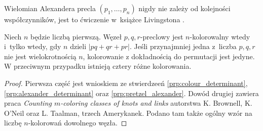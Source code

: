 Wielomian Alexandera precla $(p_1, \ldots, p_n)$ nigdy nie zależy od kolejności współczynników, jest to ćwiczenie w~książce Livingstona \cite[s. 215]{livingston93}.

\begin{proposition}
    Niech $n$ będzie liczbą pierwszą.
    Węzeł $p, q, r$-preclowy jest $n$-kolorowalny wtedy i~tylko wtedy, gdy $n$ dzieli $|pq+qr+pr|$.
    Jeśli przynajmniej jedna z~liczba $p, q, r$ nie jest wielokrotnością $n$, kolorowanie z dokładnością do permutacji jest jedyne.
    W przeciwnym przypadku istnieją cztery różne kolorowania.
%
\end{proposition}

\begin{proof}
    Pierwsza część jest wnioskiem ze stwierdzeeń \ref{prp:colour_determinant}, \ref{prp:alexander_determinant} oraz \ref{prp:pretzel_alexander}.
    Dowód drugiej zawiera praca \emph{Counting $m$-coloring classes of knots and links} autorstwa K. Brownell, K. O'Neil oraz L. Taalman, trzech Amerykanek.
    Podano tam także ogólny wzór na liczbę $n$-kolorowań dowolnego węzła.
\end{proof}

%


